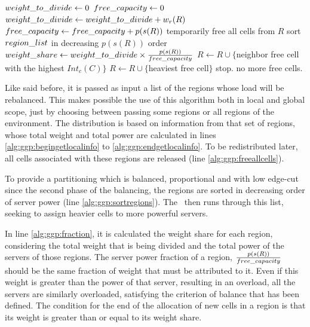 \begin{algorithm}
\caption{\ggp}
\label{alg:ggp}
\begin{algorithmic}[1]
	 \STATE $weight\_to\_divide \leftarrow 0$ \label{alg:ggp:begingetlocalinfo}
	 \STATE $free\_capacity \leftarrow 0$
	 		\STATE $weight\_to\_divide \leftarrow weight\_to\_divide + w_r(R)$
	 		\STATE $free\_capacity \leftarrow free\_capacity + p(s(R))$
	 		\STATE temporarily free all cells from $R$ \label{alg:ggp:freeallcells}
	 \ENDFOR \label{alg:ggp:endgetlocalinfo}
	 \STATE sort $region\_list$ in decreasing $p(s(R))$ order \label{alg:ggp:sortregions}
	 		\STATE $weight\_share \leftarrow weight\_to\_divide \times \frac{p(s(R))}{free\_capacity}$ \label{alg:ggp:fraction}
	 		 \label{alg:ggp:whilefraction}
	 		   		\STATE $R \leftarrow R \cup \{$neighbor free cell with the highest $Int_c(C)$$\}$ \label{alg:ggp:freeneighbor}
	 		   		\STATE $R \leftarrow R \cup \{$heaviest free cell$\}$ \label{alg:ggp:freeheavycell}
	 		   \ELSE
	 		   		\STATE stop. no more free cells.
	 		   \ENDIF
	 		\ENDWHILE
	 \ENDFOR
\end{algorithmic}
\end{algorithm}

Like said before, it is passed as input a list of the regions whose load will be rebalanced. This makes possible the use of this algorithm both in local and global scope, just by choosing between passing some regions or all regions of the environment. The distribution is based on information from that set of regions, whose total weight and total power are calculated in lines \ref{alg:ggp:begingetlocalinfo} to \ref{alg:ggp:endgetlocalinfo}. To be redistributed later, all cells associated with these regions are released (line \ref{alg:ggp:freeallcells}).

To provide a partitioning which is balanced, proportional and with low edge-cut since the second phase of the balancing, the regions are sorted in decreasing order of server power (line \ref{alg:ggp:sortregions}). The \ggp\ then runs through this list, seeking to assign heavier cells to more powerful servers.%

In line \ref{alg:ggp:fraction}, it is calculated the weight share for each region, considering the total weight that is being divided and the total power of the servers of those regions. The server power fraction of a region, $\frac{p(s(R))}{free\_capacity}$ should be the same fraction of weight that must be attributed to it. Even if this weight is greater than the power of that server, resulting in an overload, all the servers are similarly overloaded, satisfying the criterion of balance that has been defined. The condition for the end of the allocation of new cells in a region is that its weight is greater than or equal to its weight share.

